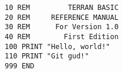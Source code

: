 \begin{verbatim}
10 REM         TERRAN BASIC
20 REM     REFERENCE MANUAL
30 REM      For Version 1.0
40 REM        First Edition
100 PRINT "Hello, world!"
110 PRINT "Git gud!"
999 END
\end{verbatim}

